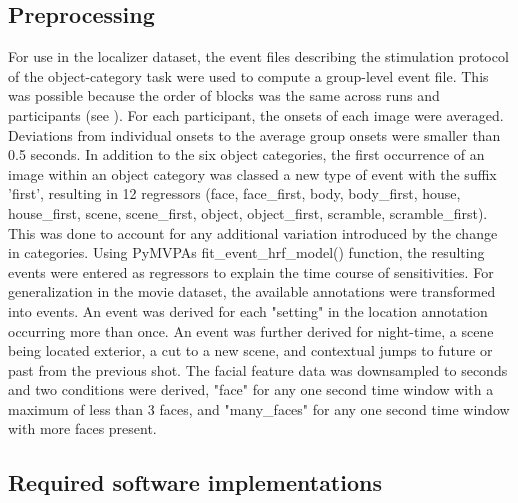\documentclass[a4paper, 12pt]{scrreprt}
\begin{document}
\subsection{Preprocessing}

For use in the localizer dataset, the event files describing the stimulation protocol of the object-category task were used to compute a group-level event file. This was possible because the order of blocks was the same across runs and participants (see \cite{sengupta2016studyforrest}). For each participant, the onsets of each image were averaged. Deviations from individual onsets to the average group onsets were smaller than 0.5 seconds. In addition to the six object categories, the first occurrence of an image within an object category was classed a new type of event with the suffix 'first', resulting in 12 regressors (face, face\_first, body, body\_first, house, house\_first, scene, scene\_first, object, object\_first, scramble, scramble\_first). This was done to account for any additional variation introduced by the change in categories. Using PyMVPAs fit\_event\_hrf\_model() function, the resulting events were entered as regressors to explain the time course of sensitivities. \newline
For generalization in the movie dataset, the available annotations were transformed into events. An event was derived for each "setting" in the location annotation occurring more than once. An event was further derived for night-time, a scene being located exterior, a cut to a new scene, and contextual jumps to future or past from the previous shot. The facial feature data was downsampled to seconds and two conditions were derived, "face" for any one second time window with a maximum of less than 3 faces, and "many\_faces" for any one second time window with more faces present.

\subsection{Required software implementations}
\end{document}
